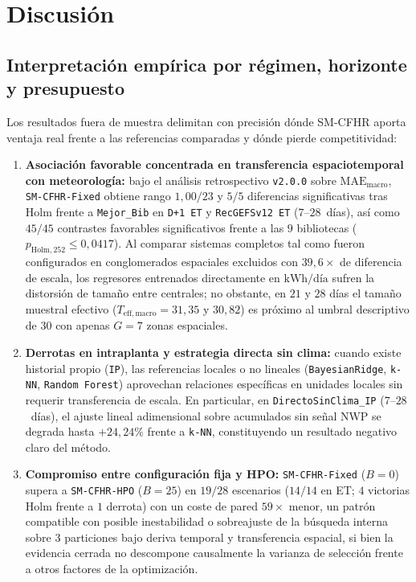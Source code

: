 \section{Discusión}\label{sec:discusion}

\subsection{Interpretación empírica por régimen, horizonte y presupuesto}

Los resultados fuera de muestra delimitan con precisión dónde SM-CFHR aporta ventaja real frente a las referencias comparadas y dónde pierde competitividad:
\begin{enumerate}
    \item \textbf{Asociación favorable concentrada en transferencia espaciotemporal con meteorología:} bajo el análisis retrospectivo \texttt{v2.0.0} sobre $\mathrm{MAE}_{\mathrm{macro}}$, \texttt{SM-CFHR-Fixed} obtiene rango $1{,}00/23$ y $5/5$ diferencias significativas tras Holm frente a \texttt{Mejor\_Bib} en \texttt{D+1 ET} y \texttt{RecGEFSv12 ET} ($7$--$28$~días), así como $45/45$ contrastes favorables significativos frente a las $9$ bibliotecas ($p_{\mathrm{Holm,252}} \le 0{,}0417$). Al comparar sistemas completos tal como fueron configurados en conglomerados espaciales excluidos con $39{,}6\times$ de diferencia de escala, los regresores entrenados directamente en $\text{kWh/día}$ sufren la distorsión de tamaño entre centrales; no obstante, en $21$ y $28$ días el tamaño muestral efectivo ($T_{\mathrm{eff,macro}} = 31{,}35$ y $30{,}82$) es próximo al umbral descriptivo de $30$ con apenas $G=7$ zonas espaciales.
    \item \textbf{Derrotas en intraplanta y estrategia directa sin clima:} cuando existe historial propio (\texttt{IP}), las referencias locales o no lineales (\texttt{BayesianRidge}, \texttt{k-NN}, \texttt{Random Forest}) aprovechan relaciones específicas en unidades locales sin requerir transferencia de escala. En particular, en \texttt{DirectoSinClima\_IP} ($7$--$28$~días), el ajuste lineal adimensional sobre acumulados sin señal NWP se degrada hasta $+24{,}24\%$ frente a \texttt{k-NN}, constituyendo un resultado negativo claro del método.
    \item \textbf{Compromiso entre configuración fija y HPO:} \texttt{SM-CFHR-Fixed} ($B=0$) supera a \texttt{SM-CFHR-HPO} ($B=25$) en $19/28$ escenarios ($14/14$ en ET; $4$ victorias Holm frente a $1$ derrota) con un coste de pared $59\times$ menor, un patrón compatible con posible inestabilidad o sobreajuste de la búsqueda interna sobre $3$ particiones bajo deriva temporal y transferencia espacial, si bien la evidencia cerrada no descompone causalmente la varianza de selección frente a otros factores de la optimización.

\end{enumerate}
